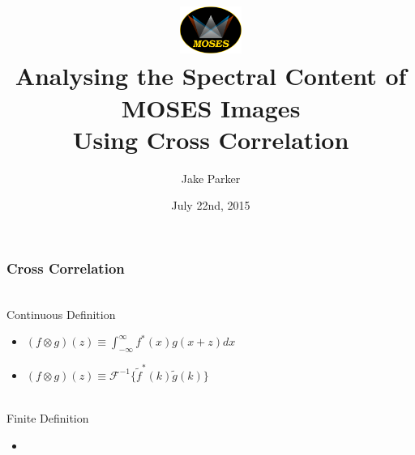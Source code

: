 \documentclass[landscape,xcolor={table},10pt]{beamer}
\title[...]{\includegraphics[width=2cm]{images/moses_logo_with_text}  \\Analysing the Spectral Content of MOSES Images \\Using Cross Correlation}
\author[Parker]{Jake Parker}
\institute{}
\date{July 22nd, 2015 \\ }
\begin{document}
	\begin{frame}[plain]
	        \titlepage
	\end{frame}
	
	\begin{frame}
		
		\frametitle{Cross Correlation}
\\Continuous Definition			
			\begin{itemize}
				\item $ (f \otimes g) (z) \equiv \int_{-\infty}^{\infty} f^*(x) g(x+z) dx$
				\item $(f \otimes g) (z) \equiv \mathcal{F}^{-1} \lbrace \tilde{f}^* (k) \tilde{g}(k)\rbrace$
			\end{itemize}
			
\\Finite Definition
	\begin{itemize}
		\item 
	\end{itemize}
			
	

	\end{frame}
	
	
\end{document}
